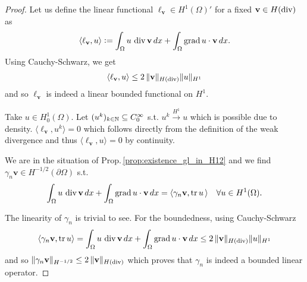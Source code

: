 \documentclass[../master_thesis.tex]{subfiles}
\begin{document}
\begin{proof}
    Let us define 
    the linear functional $\ell_\mathbf{v} \in H^1(\Omega)'$ for a fixed $\mathbf{v} \in H(\operatorname{div})$
    as
    \begin{align*}
        \langle \ell_\mathbf{v}, u \rangle \vcentcolon= \int_\Omega u \, \operatorname{div} \mathbf{v} \, dx 
         + \int_\Omega \operatorname{grad} u \cdot \mathbf{v} \, dx.
    \end{align*}
    Using Cauchy-Schwarz, we get
    \begin{align*}
        \langle \ell_\mathbf{v}, u \rangle 
        \leq 2 \, \lVert \mathbf{v} \rVert _{H(\operatorname{div})} \lVert u \rVert _{H^1} 
    \end{align*}
    and so $\ell_\mathbf{v}$ is indeed a linear bounded functional on $H^1$.
    
    Take $u \in H^1_0(\Omega)$. 
    Let $(u^k)_{k\in \mathbb{N}} \subseteq C^\infty_0$ s.t. 
    $u^k \xrightarrow{H^1} u$ which is possible due to density. 
    $\langle \ell_\mathbf{v}, u^k \rangle  = 0$  which follows directly from the  
    definition of the weak divergence and thus $\langle \ell_\mathbf{v}, u \rangle = 0$
    by continuity.

    We are in the situation of Prop.\,\ref{prop:existence_gl_in_H12} 
    and we find $\gamma_n \mathbf{v} \in H^{-1/2}(\partial \Omega)$ 
    s.t. 
    \begin{align*}
        \int_\Omega u \, \operatorname{div} \mathbf{v} \, dx 
        + \int_\Omega \operatorname{grad} u \cdot \mathbf{v} \, dx 
        = \langle \gamma_n \mathbf{v}, \operatorname{tr} u \, \rangle \quad \forall u \in H^1(\Omega).
    \end{align*}
    
    The linearity of $\gamma_n$ is trivial to see.
    For the boundedness, using Cauchy-Schwarz 
    \begin{align*}
        \langle \gamma_n \mathbf{v}, \operatorname{tr} u \rangle 
        = \int_\Omega u \, \operatorname{div} \mathbf{v} \, dx 
            + \int_\Omega \operatorname{grad} u \cdot \mathbf{v} \, dx
        \leq 2 \, \lVert \mathbf{v} \rVert _{H(\operatorname{div})} \lVert u \rVert _{H^1}
    \end{align*}
    and so $\lVert \gamma_n \mathbf{v} \rVert _{H^{-1/2}} \leq 2 \,\lVert \mathbf{v} \rVert _{H(\operatorname{div})}$
    which proves that $\gamma_n$ is indeed a bounded linear operator.


\end{proof}
\end{document}
